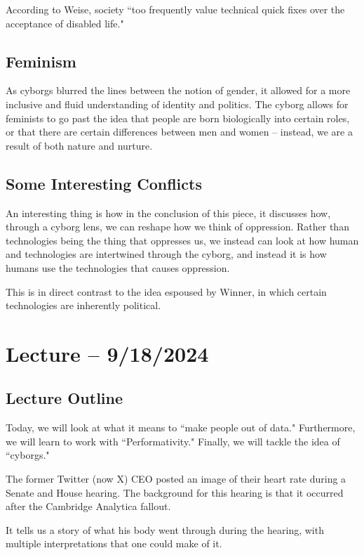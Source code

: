 \documentclass[openany]{book}
\begin{document}
According to Weise, society ``too frequently value technical quick fixes over the acceptance of disabled life."

\subsection{Feminism}
As cyborgs blurred the lines between the notion of gender, it allowed for a more inclusive and fluid understanding of identity and politics. The cyborg allows for feminists to go past the idea that people are born biologically into certain roles, or that there are certain differences between men and women -- instead, we are a result of both nature and nurture.

\subsection{Some Interesting Conflicts}
An interesting thing is how in the conclusion of this piece, it discusses how, through a cyborg lens, we can reshape how we think of oppression. Rather than technologies being the thing that oppresses us, we instead can look at how human and technologies are intertwined through the cyborg, and instead it is how humans use the technologies that causes oppression.

This is in direct contrast to the idea espoused by Winner, in which certain technologies are inherently political.

\section{Lecture -- 9/18/2024}
\subsection{Lecture Outline}
Today, we will look at what it means to ``make people out of data." Furthermore, we will learn to work with ``Performativity." Finally, we will tackle the idea of ``cyborgs."

\begin{example}
	The former Twitter (now X) CEO posted an image of their heart rate during a Senate and House hearing. The background for this hearing is that it occurred after the Cambridge Analytica fallout.
	
	It tells us a story of what his body went through during the hearing, with multiple interpretations that one could make of it.
\end{example}
\end{document}

